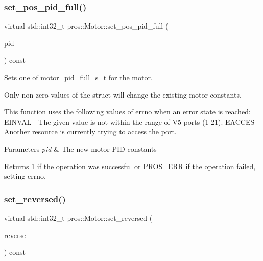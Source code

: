 \subsubsection{\texorpdfstring{set\_pos\_pid\_full()}{set\_pos\_pid\_full()}}
{\footnotesize\ttfamily virtual std\+::int32\+\_\+t pros\+::\+Motor\+::set\+\_\+pos\+\_\+pid\+\_\+full (\begin{DoxyParamCaption}\item[{const \mbox{\hyperlink{motors_8h_a0295cbf49f5c70c17b5fa962bd25febd}{motor\+\_\+pid\+\_\+full\+\_\+s\+\_\+t}}}]{pid }\end{DoxyParamCaption}) const\hspace{0.3cm}{\ttfamily [virtual]}}



Sets one of motor\+\_\+pid\+\_\+full\+\_\+s\+\_\+t for the motor. 

Only non-\/zero values of the struct will change the existing motor constants.

This function uses the following values of errno when an error state is reached\+: E\+I\+N\+V\+AL -\/ The given value is not within the range of V5 ports (1-\/21). E\+A\+C\+C\+ES -\/ Another resource is currently trying to access the port.


\begin{DoxyParams}{Parameters}
{\em pid} & The new motor P\+ID constants\\
\hline
\end{DoxyParams}
\begin{DoxyReturn}{Returns}
1 if the operation was successful or P\+R\+O\+S\+\_\+\+E\+RR if the operation failed, setting errno. 
\end{DoxyReturn}
\mbox{\label{classpros_1_1Motor_a44fcc6447ed1416e880232baa16a221e}} 
\subsubsection{\texorpdfstring{set\_reversed()}{set\_reversed()}}
{\footnotesize\ttfamily virtual std\+::int32\+\_\+t pros\+::\+Motor\+::set\+\_\+reversed (\begin{DoxyParamCaption}\item[{const bool}]{reverse }\end{DoxyParamCaption}) const\hspace{0.3cm}{\ttfamily [virtual]}}



